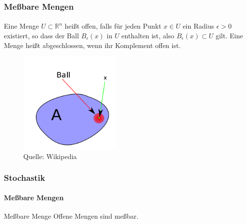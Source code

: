 \documentclass{beamer}
\begin{document}
\begin{frame}
    \frametitle{Meßbare Mengen}
\framesubtitle{}

\begin{block}{}
Eine Menge $U \subset  \mathbb{R}^n$ heißt offen, falls für jeden Punkt $x \in U$ ein Radius $\epsilon > 0$ existiert, so dass der Ball $B_\epsilon (x)$ in $U$ enthalten ist, also 
$B_\epsilon (x) \subset U$ gilt. Eine Menge heißt abgeschlossen, wenn ihr Komplement offen ist.
\end{block}

\begin{figure}[htp]
      \centering
    \includegraphics[width=0.45\textwidth]{img/openset}
      \caption{Quelle: Wikipedia}
\end{figure}

\end{frame}


 \begin{frame}
    \frametitle{Stochastik}
\framesubtitle{Meßbare Mengen}

    \begin{block}{Meßbare Menge}
        Offene Mengen sind meßbar.
\end{block}

\end{frame}
\end{document}
